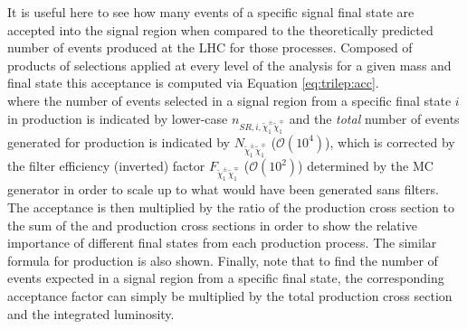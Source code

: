 It is useful here to see how many events of a specific signal final state are accepted into the signal region when compared to the theoretically predicted number of events produced at the LHC for those processes.
Composed of products of selections applied at every level of the analysis for a given mass and final state this acceptance is computed via Equation \ref{eq:trilep:acc}.
\vspace{0.3cm}\\
where the number of events selected in a signal region from a specific final state $i$ in \CCsignal production is indicated by lower-case $n_{SR,i,{\tilde\chi^\pm_1\tilde\chi^\mp_1}}$ and the \emph{total} number of events generated for \CCsignal production is indicated by $N_{{\tilde\chi^\pm_1\tilde\chi^\mp_1}}$ ($\mathcal{O}(10^4)$), which is corrected by the filter efficiency (inverted) factor $F_{{\tilde\chi^\pm_1\tilde\chi^\mp_1}}$ ($\mathcal{O}(10^{2})$) determined by the MC generator in order to scale up to what would have been generated sans filters.
The acceptance is then multiplied by the ratio of the \CCsignal production cross section to the sum of the \CCsignal and \CNsignal production cross sections in order to show the relative importance of different final states from each production process. 
The similar formula for \CNsignal production is also shown.  Finally, note that to find the number of events expected in a signal region from a specific final state, the corresponding acceptance factor can simply be multiplied by the total production cross section and the integrated luminosity.  

